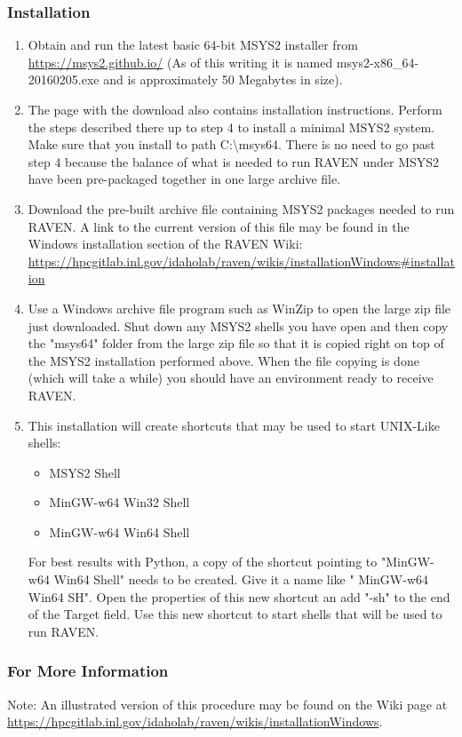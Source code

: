 \subsubsection{Installation}
\begin{enumerate}
    \item Obtain and run the latest basic 64-bit MSYS2 installer from \url{ https://msys2.github.io/} (As of this writing it is named
	msys2-x86\_64-20160205.exe and is approximately 50 Megabytes in size).
    \item The page with the download also contains installation instructions. Perform the steps described there up to
	step 4 to install a minimal MSYS2 system. Make sure that you install to path C:\textbackslash{}msys64. There
	is no need to go past step 4 because the balance of what is needed to run RAVEN under MSYS2 have been
	pre-packaged together in one large archive file.
    \item Download the pre-built archive file containing MSYS2 packages needed to run RAVEN.  A link to the current version of
	this file may be found in the Windows installation section of the RAVEN Wiki:
	\url{https://hpcgitlab.inl.gov/idaholab/raven/wikis/installationWindows#installation}
    \item Use a Windows archive file program such as WinZip to open the large zip file just downloaded.  Shut down any
	MSYS2 shells you have open and then copy the "msys64" folder from the large zip file so that it is copied right
	on top of the MSYS2 installation performed above. When the file copying is done (which will take a while)
	you should have an environment ready to receive RAVEN.
    \item This installation will create shortcuts that may be used to start UNIX-Like shells:
	\begin{itemize}
	    \item MSYS2 Shell
	    \item MinGW-w64 Win32 Shell
	    \item MinGW-w64 Win64 Shell
	\end{itemize}
	For best results with Python, a copy of the shortcut pointing to  "MinGW-w64 Win64 Shell" needs to be created. Give
	it a name like " MinGW-w64 Win64 SH".  Open the properties of this new shortcut an add "-sh" to the end of the Target
	field.  Use this new shortcut to start shells that will be used to run RAVEN.
\end{enumerate}


\subsubsection{For More Information}
Note: An illustrated version of this procedure may be found on the Wiki page at
\url{https://hpcgitlab.inl.gov/idaholab/raven/wikis/installationWindows}.

